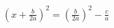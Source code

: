 \documentclass[preview]{standalone}
\begin{document}
\begin{align*}
\left(x + \frac{b}{2a}\right)^2 = \left(\frac{b}{2a}\right)^2 - \frac{c}{a}
\end{align*}
\end{document}
